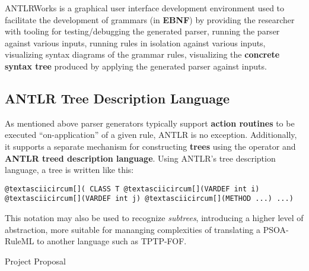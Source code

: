 \documentclass[letterpaper,10pt,english]{sphinxmanual}
\begin{document}
ANTLRWorks is a graphical user interface development environment used to
facilitate the development of grammars (in \textbf{EBNF}) by providing the researcher
with tooling for testing/debugging the generated parser, running the parser
against various inputs, running rules in isolation against various inputs,
visualizing syntax diagrams of the grammar rules, visualizing the \textbf{concrete
syntax tree} produced by applying the generated parser against inputs.


\subsection{ANTLR Tree Description Language}
\label{project-proposal/index:antlr-tree-description-language}
As mentioned above parser generators typically support \textbf{action routines} to be
executed ``on-application'' of a given rule, ANTLR is no exception.  Additionally,
it supports a separate mechanism for constructing \textbf{trees} using the \code{-\textgreater{}}
operator and \textbf{ANTLR treed description language}.  Using ANTLR’s tree
description language, a tree is written like this:

\begin{Verbatim}[commandchars=@\[\]]
@textasciicircum[]( CLASS T @textasciicircum[](VARDEF int i) @textasciicircum[](VARDEF int j) @textasciicircum[](METHOD ...) ...)
\end{Verbatim}

This notation may also be used to recognize \emph{subtrees}, introducing a higher
level of abstraction, more suitable for mananging complexities of translating a
PSOA-RuleML to another language such as TPTP-FOF.

Project Proposal
\end{document}
